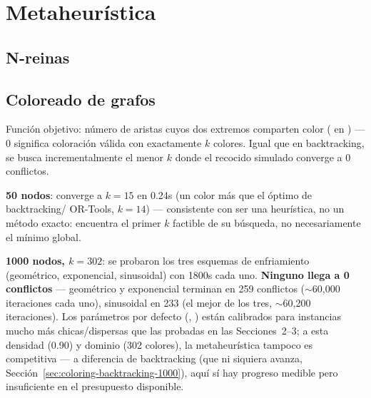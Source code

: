 \section{Metaheur\'istica}


\subsection{N-reinas}

\subsection{Coloreado de grafos}

Función objetivo: número de aristas cuyos dos extremos comparten color (
en ) --- 0 significa coloración válida con exactamente $k$
colores. Igual que en backtracking, se busca incrementalmente el menor $k$ donde el recocido
simulado converge a 0 conflictos.

\textbf{50 nodos}: converge a $k=15$ en 0.24s (un color más que el óptimo de backtracking/
OR-Tools, $k=14$) --- consistente con ser una heurística, no un método exacto: encuentra el
primer $k$ factible de su búsqueda, no necesariamente el mínimo global.

\textbf{1000 nodos, $k=302$}: se probaron los tres esquemas de enfriamiento (geométrico,
exponencial, sinusoidal) con 1800s cada uno. \textbf{Ninguno llega a 0 conflictos} ---
geométrico y exponencial terminan en 259 conflictos ($\sim$60{,}000 iteraciones cada uno),
sinusoidal en 233 (el mejor de los tres, $\sim$60{,}200 iteraciones). Los parámetros por defecto
(, ) están calibrados para instancias
mucho más chicas/dispersas que las probadas en las Secciones~2--3; a esta densidad (0.90) y
dominio (302 colores), la metaheurística tampoco es competitiva --- a diferencia de backtracking
(que ni siquiera avanza, Secci\'on~\ref{sec:coloring-backtracking-1000}), aquí sí hay progreso
medible pero insuficiente en el presupuesto disponible.

